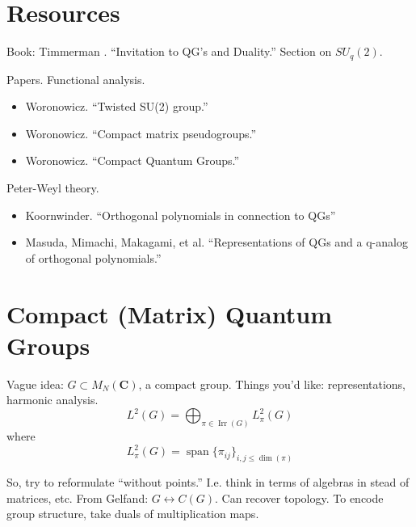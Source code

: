\documentclass{article}
\DeclareMathOperator{\Irr}{Irr}
\DeclareMathOperator{\spn}{span}
\begin{document}
\section{Resources}
Book: Timmerman . ``Invitation to QG's and Duality.'' Section on $SU_q(2)$.

Papers. Functional analysis.
\begin{itemize}
\item Woronowicz.  ``Twisted SU(2) group.''
\item Woronowicz. ``Compact matrix pseudogroups.''
\item Woronowicz. ``Compact Quantum Groups.''
\end{itemize}

Peter-Weyl theory.
\begin{itemize}
\item Koornwinder. ``Orthogonal polynomials in connection to QGs''
\item Masuda, Mimachi, Makagami, et al. ``Representations of QGs and a q-analog of orthogonal polynomials.''
\end{itemize}

\section{Compact (Matrix) Quantum Groups}
Vague idea: $G \subset M_N(\mathbf C)$, a compact group.  
Things you'd like: representations, harmonic analysis.  
$$L^2(G) = \bigoplus_{\pi \in \Irr(G)} L^2_\pi(G)$$
where
$$L^2_\pi(G) = \spn\{\pi_{ij}\}_{i,j \le \dim(\pi)}$$

So, try to reformulate ``without points.'' I.e. think in terms of algebras in stead of matrices, etc. From Gelfand: $G \leftrightarrow C(G)$. Can recover topology. To encode group structure, take duals of multiplication maps.
\end{document}
